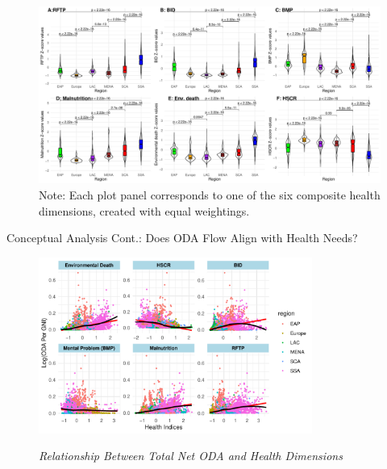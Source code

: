 \documentclass[aspectratio=169,handout, 10pt]{beamer}
\begin{document}
\begin{frame}%
     \begin{figure}
            \caption{Figure 5: Composite Health Dimensions Across Regions of Developing Countries}%
            \includegraphics[width = \textwidth]{Figures and Tables/Combined_Boxplt_2.pdf}
       \caption*{\footnotesize{Note: Each plot panel corresponds to one of the six composite health dimensions, created with equal weightings.}}%
        \end{figure}
        
\end{frame}




\begin{frame}{Conceptual Analysis Cont.: Does ODA Flow Align with Health Needs?}
    \begin{figure}
\caption{\textit{Relationship Between Total Net ODA and Health Dimensions}}
    \includegraphics[width = 0.8\textwidth, height = 0.8\textheight]{Figures and Tables/ODA_Hth_plt.pdf}
    \label{fig:ODA against Hth dimension}
\end{figure}
\end{frame}
\end{document}
